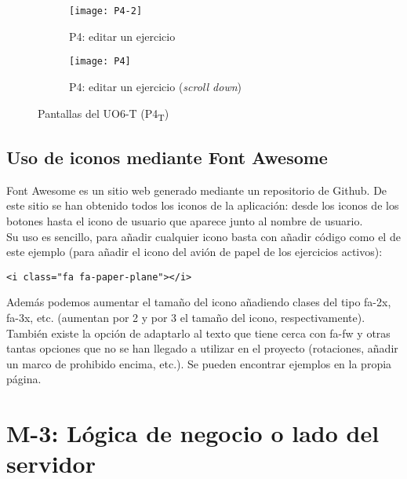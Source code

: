 \noindent
\begin{figure}[!htbp]
\begin{subfigure}[t]{0.5\textwidth}
	\centering
	\texttt{[image: P4-2]}
	\caption{P4: editar un ejercicio}
	\label{fig:diseno-e-implementacion:interfaces:profesor:uo6-t:p4}
\end{subfigure}
%
\begin{subfigure}[t]{0.5\textwidth}
	\centering
	\texttt{[image: P4]}
	\caption{P4: editar un ejercicio (\textit{scroll down})}
	\label{fig:diseno-e-implementacion:interfaces:profesor:uo6-t:p4'}
\end{subfigure}

\caption{Pantallas del UO6-T (P4\textsubscript{T})}
\label{fig:diseno-e-implementacion:interfaces:profesor:uo6-t}
\end{figure}

\subsection{Uso de iconos mediante Font Awesome}
\label{diseno-e-implementacion:interfaces:font-awesome}

Font Awesome \hyperref[fontawesome]{\cite{fontawesome}} es un sitio web generado mediante un repositorio de Github. De este sitio se han obtenido todos los iconos de la aplicación: desde los iconos de los botones hasta el icono de usuario que aparece junto al nombre de usuario.\\

Su uso es sencillo, para añadir cualquier icono basta con añadir código como el de este ejemplo (para añadir el icono del avión de papel de los ejercicios activos):\\

\begin{lstlisting}[frame=single]
<i class="fa fa-paper-plane"></i>
\end{lstlisting}

Además podemos aumentar el tamaño del icono añadiendo clases del tipo fa-2x, fa-3x, etc. (aumentan por 2 y por 3 el tamaño del icono, respectivamente). También existe la opción de adaptarlo al texto que tiene cerca con fa-fw y otras tantas opciones que no se han llegado a utilizar en el proyecto (rotaciones, añadir un marco de prohibido encima, etc.). Se pueden encontrar ejemplos en la propia página.\\

\section{M-3: Lógica de negocio o lado del servidor}
\label{diseno-e-implementacion:logica-negocio}

